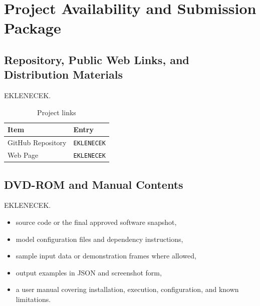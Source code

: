 \section{Project Availability and Submission Package}
\label{sec:availability}

\subsection{Repository, Public Web Links, and Distribution Materials}

EKLENECEK.

\begin{table}[H]
  \centering
  \caption{Project links}
  \begin{tabularx}{\textwidth}{@{}p{4.3cm}X@{}}
    \toprule
    Item & Entry \\
    \midrule
    GitHub Repository & \texttt{EKLENECEK} \\
    Web Page & \texttt{EKLENECEK} \\
    \bottomrule
  \end{tabularx}
\end{table}

\subsection{DVD-ROM and Manual Contents}

EKLENECEK.

\begin{itemize}[nosep]
  \item source code or the final approved software snapshot,
  \item model configuration files and dependency instructions,
  \item sample input data or demonstration frames where allowed,
  \item output examples in JSON and screenshot form,
  \item a user manual covering installation, execution, configuration, and known limitations.
\end{itemize}

